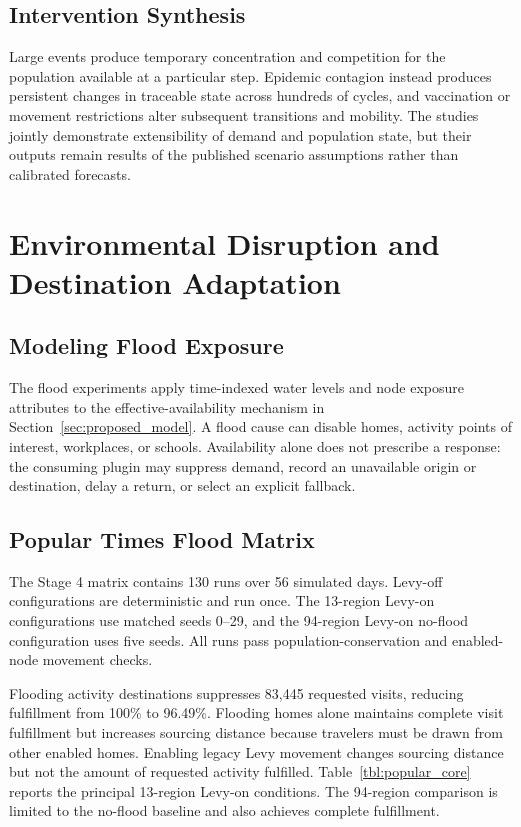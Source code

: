 \documentclass[pdflatex,sn-mathphys-num]{sn-jnl}%
\theoremstyle{thmstyleone}%
\theoremstyle{thmstyletwo}%
\theoremstyle{thmstylethree}%
\begin{document}
\subsection{Intervention Synthesis}

Large events produce temporary concentration and competition for the population available at a particular step. Epidemic contagion instead produces persistent changes in traceable state across hundreds of cycles, and vaccination or movement restrictions alter subsequent transitions and mobility. The studies jointly demonstrate extensibility of demand and population state, but their outputs remain results of the published scenario assumptions rather than calibrated forecasts.

\section{Environmental Disruption and Destination Adaptation}
\label{sec:flood_mobility}

\subsection{Modeling Flood Exposure}

The flood experiments apply time-indexed water levels and node exposure attributes to the effective-availability mechanism in Section~\ref{sec:proposed_model}. A flood cause can disable homes, activity points of interest, workplaces, or schools. Availability alone does not prescribe a response: the consuming plugin may suppress demand, record an unavailable origin or destination, delay a return, or select an explicit fallback.

\subsection{Popular Times Flood Matrix}
The Stage 4 matrix contains 130 runs over 56 simulated days. Levy-off configurations are deterministic and run once. The 13-region Levy-on configurations use matched seeds 0--29, and the 94-region Levy-on no-flood configuration uses five seeds. All runs pass population-conservation and enabled-node movement checks.

Flooding activity destinations suppresses 83,445 requested visits, reducing fulfillment from 100\% to 96.49\%. Flooding homes alone maintains complete visit fulfillment but increases sourcing distance because travelers must be drawn from other enabled homes. Enabling legacy Levy movement changes sourcing distance but not the amount of requested activity fulfilled. Table~\ref{tbl:popular_core} reports the principal 13-region Levy-on conditions. The 94-region comparison is limited to the no-flood baseline and also achieves complete fulfillment.
\end{document}
